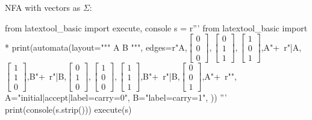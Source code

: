 NFA with vectors as $\Sigma$:
\begin{python}
from latextool_basic import execute, console
s = r'''
from latextool_basic import * 
print(automata(layout="""
A      B
""",
edges=r"A,$\begin{bmatrix}0\\0\\0 \end{bmatrix},\begin{bmatrix}0\\1\\1 \end{bmatrix},\begin{bmatrix}1\\0\\1 \end{bmatrix}$,A"+\
r"|A,$\begin{bmatrix}1\\1\\0\end{bmatrix}$,B"+\
r"|B,$\begin{bmatrix}0\\1\\0\end{bmatrix},\begin{bmatrix}1\\0\\0\end{bmatrix},\begin{bmatrix}1\\1\\1\end{bmatrix}$,B"+\
r"|B,$\begin{bmatrix}0\\0\\1\end{bmatrix}$,A"+\
r"",
A="initial|accept|label=carry=0",
B="label=carry=1",
))
'''
print(console(s.strip()))
execute(s)
\end{python}
